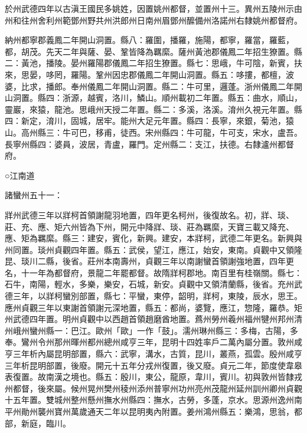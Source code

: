 \begin{pinyinscope}
 於州武德四年以古滇王國民多姚姓，因置姚州都督，並置州十三。異州五陵州示由州和往州舍利州範鄧州野共州洪郎州日南州眉鄧州醿備州洛諾州右隸姚州都督府。



 納州都寧郡義鳳二年開山洞置。縣八：羅圍，播羅，施陽，都寧，羅當，羅藍，都，胡茂。先天二年與薩、晏、鞏皆降為羈縻。薩州黃池郡儀鳳二年招生獠置。縣二：黃池，播陵。晏州羅陽郡儀鳳二年招生獠置。縣七：思峨，牛可陰，新賓，扶來，思晏，哆罔，羅陽。鞏州因忠郡儀鳳二年開山洞置。縣五：哆摟，都檀，波婆，比求，播郎。奉州儀鳳二年開山洞置。縣二：牛可里，邏蓬。浙州儀鳳二年開山洞置。縣四：浙源，越賓，洛川，鱗山。順州載初二年置。縣五：曲水，順山，靈巖，來猿，龍池。思峨州天授二年置。縣二：多溪，洛溪。淯州久視元年置。縣四：新定，淯川，固城，居牢。能州大足元年置。縣四：長寧，來銀，菊池，猿山。高州縣三：牛可巴，移甫，徒西。宋州縣四：牛可龍，牛可支，宋水，盧吾。長寧州縣四：婆員，波居，青盧，羅門。定州縣二：支江，扶德。右隸瀘州都督府。



 ○江南道



 諸蠻州五十一：



 牂州武德三年以牂柯首領謝龍羽地置，四年更名柯州，後復故名。初，牂、琰、莊、充、應、矩六州皆為下州，開元中降牂、琰、莊為羈縻，天寶三載又降充、應、矩為羈縻。縣三：建安，賓化，新興。建安，本牂柯，武德二年更名。新興與州同置。琰州貞觀四年置。縣五：武侯，望江，應江，始安，東南。貞觀中又領隆昆、琰川二縣，後省。莊州本南壽州，貞觀三年以南謝蠻首領謝強地置，四年更名，十一年為都督府，景龍二年罷都督。故隋牂柯郡地。南百里有桂嶺關。縣七：石牛，南陽，輕水，多樂，樂安，石城，新安。貞觀中又領清蘭縣，後省。充州武德三年，以牂柯蠻別部置，縣七：平蠻，東停，韶明，牂柯，東陵，辰水，思王。應州貞觀三年以東謝首領謝元深地置，縣五：都尚，婆覽，應江，惣隆，羅恭。矩州武德四年置。明州貞觀中以西趙首領趙磨酋地置。蔿州勞州羲州福州犍州邦州清州峨州蠻州縣一：巴江。歐州「歐」一作「鼓」。濡州琳州縣三：多梅，古陽，多奉。鸞州令州那州暉州都州總州咸亨三年，昆明十四姓率戶二萬內屬分置。敦州咸亨三年析內屬昆明部置，縣六：武寧，溝水，古質，昆川，叢燕，孤雲。殷州咸亨三年析昆明部置，後廢。開元十五年分戎州復置，後又廢。貞元二年，節度使韋皋表復置。故南漢之境也。縣五：殷川，東公，龍原，韋川，賓川。初與敦州皆隸戎州都督，後來屬。候州晃州樊州稜州添州普寧州功州亮州茂龍州延州訓州卿州貞觀十五年置。雙城州整州懸州撫水州縣四：撫水，古勞，多蓬，京水。思源州逸州南平州勛州襲州寶州萬歲通天二年以昆明夷內附置。姜州鴻州縣五：樂鴻，思翁，都部，新庭，臨川。




\end{pinyinscope}
